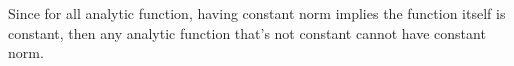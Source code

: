 \documentclass{article}
\newtheorem{question}{Question}
\begin{document}
\hfill

Since for all analytic function, having constant norm implies the function itself is constant, then any analytic function that's not constant cannot have constant norm.


\break


\begin{comment}
\section*{7 (Unsolved)}
\begin{question}
    \textbf{Ahlfors Pg. 28 Problem 5}
\end{question}

\textbf{Pf:}

Let $z=x+iy$ for $x,y\in\mathbf{R}$, which $f(x+iy) = u(x,y)+iv(x,y)$ for some real-valued function $u$ and $v$. 

Then, $\bar{z}=x-iy$, with $\overline{f(\bar{z})} = \overline{f(x-iy)} = \overline{u(x,-y)+iv(x,-y)} = u(x,-y)-iv(x,-y)$. Which, let $u_1(x,y) = u(x,-y)$, and $v_1(x,y)=-v(x,-y)$, then $\overline{f(\bar{z})} = u_1(x,y)+iv_1(x,y)$.

\hfill

By the definition of analytic function, $f(z)$ is analytic if and only if Cauchy-Riemann Equation is satisfied with $u,v$:
$$\frac{\partial u}{\partial x}=\frac{\partial v}{\partial y},\quad \frac{\partial v}{\partial x}=-\frac{\partial u}{\partial y}$$

Similarly, $\overline{f(\bar{z})}$ is analytic if and only if Cauchy-Riemann Equation is satisfied with $u_1,v_1$:
$$\frac{\partial u_1}{\partial x}=\frac{\partial v_1}{\partial y},\quad \frac{\partial v_1}{\partial x}=-\frac{\partial u_1}{\partial y}$$
Which, let $y_1=-y$ (which $\frac{\partial y_1}{\partial y}=-1$, and $\frac{\partial y_1}{\partial x}=0$), we have $u_1(x,y) = u(x,y_1)$ and $v_1(x,y)=-v(x,y_1)$. Then, the following is true:
$$\frac{\partial u_1}{\partial x}=\frac{\partial}{\partial x}(u(x,y_1)) = \frac{\partial u}{\partial x}\frac{\partial x}{\partial x}+\frac{\partial u}{\partial y_1}\frac{\partial y_1}{\partial x} = \frac{\partial u}{\partial x}\cdot 1+\frac{\partial u}{\partial y_1}\cdot 0 = \frac{\partial u}{\partial x}$$
$$\frac{\partial u_1}{\partial y}=\frac{\partial}{\partial y}(u(x,y_1)) = \frac{\partial u}{\partial x}\frac{\partial x}{\partial y}+\frac{\partial u}{\partial y_1}\frac{\partial y_1}{\partial y} = \frac{\partial u}{\partial x}\cdot 0+\frac{\partial u}{\partial y_1}\cdot (-1) = -\frac{\partial u}{\partial y_1}$$


\end{comment}
\end{document}
